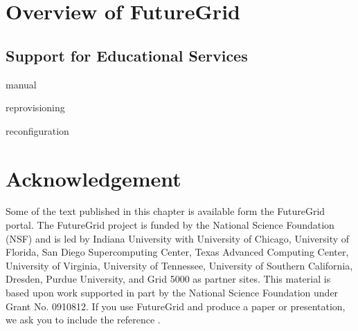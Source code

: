 \documentclass{article}
\begin{document}



\section{Overview of FutureGrid}












\subsection{Support for Educational Services}

manual

reprovisioning

reconfiguration








\section*{Acknowledgement}

Some of the text published in this chapter is available form the
FutureGrid portal. The FutureGrid project is funded by the National
Science Foundation (NSF) and is led by Indiana University with
University of Chicago, University of Florida, San Diego Supercomputing
Center, Texas Advanced Computing Center, University of Virginia,
University of Tennessee, University of Southern California, Dresden,
Purdue University, and Grid 5000 as partner sites. This material is
based upon work supported in part by the National Science Foundation
under Grant No. 0910812. If you use FutureGrid and produce a paper or
presentation, we ask you to include the reference
\cite{las2010gce,las12fg-bookchapter}.






%
\end{document}

